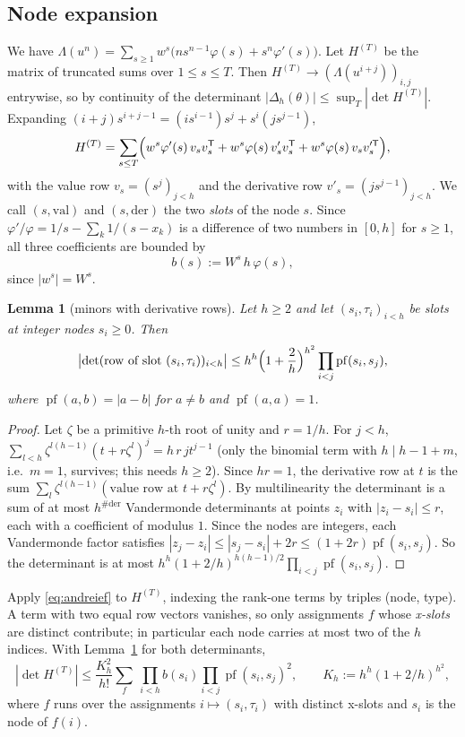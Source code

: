 \documentclass[11pt]{amsart}
\newtheorem{lemma}[theorem]{Lemma}
\theoremstyle{definition}
\theoremstyle{remark}
\numberwithin{equation}{section}
\begin{document}
\subsection{Node expansion}
We have $\Lambda(u^n)=\sum_{s\ge1}w^s\bigl(ns^{n-1}\varphi(s)+s^n\varphi'(s)\bigr)$. Let $H^{(T)}$ be the matrix of
truncated sums over $1\le s\le T$. Then $H^{(T)}\to(\Lambda(u^{i+j}))_{i,j}$ entrywise, so by continuity of the
determinant $|\Delta_h(\theta)|\le\sup_T|\det H^{(T)}|$. Expanding $(i+j)s^{i+j-1}=(is^{i-1})s^j+s^i(js^{j-1})$,
\[
  H^{(T)}=\sum_{s\le T}\Bigl(w^s\varphi'(s)\,v_sv_s^{\mathsf T}+w^s\varphi(s)\,v'_sv_s^{\mathsf T}+w^s\varphi(s)\,v_sv_s'^{\mathsf T}\Bigr),
\]
with the value row $v_s=(s^j)_{j<h}$ and the derivative row $v'_s=(js^{j-1})_{j<h}$. We call $(s,\mathrm{val})$ and
$(s,\mathrm{der})$ the two \emph{slots} of the node $s$. Since $\varphi'/\varphi=1/s-\sum_k1/(s-x_k)$ is a difference of two
numbers in $[0,h]$ for $s\ge1$, all three coefficients are bounded by
\[
  b(s):=W^s\,h\,\varphi(s),
\]
since $|w^s|=W^s$.

\begin{lemma}[minors with derivative rows]\label{lem:slotdet}
Let $h\ge2$ and let $(s_i,\tau_i)_{i<h}$ be slots at integer nodes $s_i\ge0$. Then
\[
  \bigl|\det(\text{row of slot }(s_i,\tau_i))_{i<h}\bigr|\le h^h\Bigl(1+\frac2h\Bigr)^{h^2}\prod_{i<j}\operatorname{pf}(s_i,s_j),
\]
where $\operatorname{pf}(a,b)=|a-b|$ for $a\ne b$ and $\operatorname{pf}(a,a)=1$.
\end{lemma}

\begin{proof}
Let $\zeta$ be a primitive $h$-th root of unity and $r=1/h$. For $j<h$,
$\sum_{l<h}\zeta^{l(h-1)}(t+r\zeta^l)^j=h\,r\,jt^{j-1}$ (only the binomial term with $h\mid h-1+m$, i.e.\ $m=1$, survives;
this needs $h\ge2$). Since $hr=1$, the derivative row at $t$ is the sum
$\sum_l\zeta^{l(h-1)}(\text{value row at }t+r\zeta^l)$. By multilinearity the determinant is a sum of at most
$h^{\#\mathrm{der}}$ Vandermonde determinants at points $z_i$ with $|z_i-s_i|\le r$, each with a coefficient of modulus
$1$. Since the nodes are integers, each Vandermonde factor satisfies
$|z_j-z_i|\le|s_j-s_i|+2r\le(1+2r)\operatorname{pf}(s_i,s_j)$.
So the determinant is at most $h^h(1+2/h)^{h(h-1)/2}\prod_{i<j}\operatorname{pf}(s_i,s_j)$.
\end{proof}

Apply \eqref{eq:andreief} to $H^{(T)}$, indexing the rank-one terms by triples (node, type). A term with two equal
row vectors vanishes, so only assignments $f$ whose \emph{x-slots} are distinct contribute; in particular each node
carries at most two of the $h$ indices. With Lemma~\ref{lem:slotdet} for both determinants,
\begin{equation}\label{eq:pattern}
  |\det H^{(T)}|\le\frac{K_h^2}{h!}\sum_{f}\ \prod_{i<h}b(s_i)\prod_{i<j}\operatorname{pf}(s_i,s_j)^2,\qquad K_h:=h^h(1+2/h)^{h^2},
\end{equation}
where $f$ runs over the assignments $i\mapsto(s_i,\tau_i)$ with distinct x-slots and $s_i$ is the node of $f(i)$.
\end{document}
